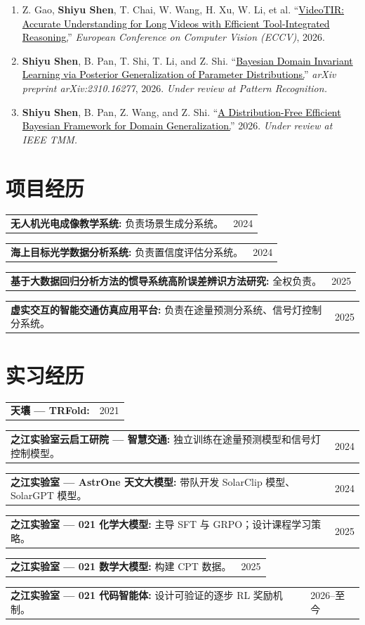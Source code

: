 \documentclass[10pt,a4paper]{article}
\makeatletter
\newcommand{\projectline}[3]{%
  \begin{tabularx}{\textwidth}{@{}X>{\raggedleft\arraybackslash}p{2.25cm}@{}}
    \small\textbf{#1}\if\relax\detokenize{#2}\relax\else\textbf{:} #2\fi &
    \small\textcolor{slate}{\mbox{#3}}
  \end{tabularx}\vspace{0.5pt}
}
\newcommand{\me}{\textbf{Shiyu Shen}}
\newcommand{\status}[1]{\textcolor{slate}{\textit{#1}}}
\newcommand{\papertitle}[2]{\href{#1}{\textcolor{black}{#2}}}
\makeatother
\begin{document}
\begin{enumerate}
  \item Z. Gao, \me, T. Chai, W. Wang, H. Xu, W. Li, et al. ``\papertitle{https://arxiv.org/abs/2603.25021}{VideoTIR: Accurate Understanding for Long Videos with Efficient Tool-Integrated Reasoning.}'' \textit{European Conference on Computer Vision (ECCV)}, 2026.
  \item \me, B. Pan, T. Shi, T. Li, and Z. Shi. ``\papertitle{https://arxiv.org/abs/2310.16277}{Bayesian Domain Invariant Learning via Posterior Generalization of Parameter Distributions.}'' \textit{arXiv preprint arXiv:2310.16277}, 2026. \status{Under review at Pattern Recognition.}
  \item \me, B. Pan, Z. Wang, and Z. Shi. ``\papertitle{https://scholar.google.com/scholar?q=\%22A\%20Distribution-Free\%20Efficient\%20Bayesian\%20Framework\%20for\%20Domain\%20Generalization\%22}{A Distribution-Free Efficient Bayesian Framework for Domain Generalization.}'' 2026. \status{Under review at IEEE TMM.}
\end{enumerate}
\section{项目经历}
\projectline{无人机光电成像教学系统}{负责场景生成分系统。}{2024}
\projectline{海上目标光学数据分析系统}{负责置信度评估分系统。}{2024}
\projectline{基于大数据回归分析方法的惯导系统高阶误差辨识方法研究}{全权负责。}{2025}
\projectline{虚实交互的智能交通仿真应用平台}{负责在途量预测分系统、信号灯控制分系统。}{2025}
\section{实习经历}
\projectline{天壤 — TRFold}{}{2021}
\projectline{之江实验室云启工研院 — 智慧交通}{独立训练在途量预测模型和信号灯控制模型。}{2024}
\projectline{之江实验室 — AstrOne 天文大模型}{带队开发 SolarClip 模型、SolarGPT 模型。}{2024}
\projectline{之江实验室 — 021 化学大模型}{主导 SFT 与 GRPO；设计课程学习策略。}{2025}
\projectline{之江实验室 — 021 数学大模型}{构建 CPT 数据。}{2025}
\projectline{之江实验室 — 021 代码智能体}{设计可验证的逐步 RL 奖励机制。}{2026–至今}
\end{document}
